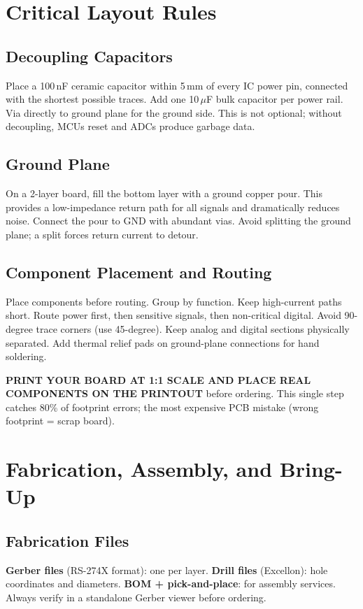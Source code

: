 \documentclass[11pt,letterpaper,twoside,openany]{book}
\begin{document}
\section{Critical Layout Rules}

\subsection{Decoupling Capacitors}
Place a 100\,nF ceramic capacitor within 5\,mm of every IC power pin, connected with the shortest possible traces. Add one 10\,$\mu$F bulk capacitor per power rail. Via directly to ground plane for the ground side. This is not optional; without decoupling, MCUs reset and ADCs produce garbage data.

\subsection{Ground Plane}
On a 2-layer board, fill the bottom layer with a ground copper pour. This provides a low-impedance return path for all signals and dramatically reduces noise. Connect the pour to GND with abundant vias. Avoid splitting the ground plane; a split forces return current to detour.

\subsection{Component Placement and Routing}
Place components before routing. Group by function. Keep high-current paths short. Route power first, then sensitive signals, then non-critical digital. Avoid 90-degree trace corners (use 45-degree). Keep analog and digital sections physically separated. Add thermal relief pads on ground-plane connections for hand soldering.

\begin{tipbox}
\textbf{PRINT YOUR BOARD AT 1:1 SCALE AND PLACE REAL COMPONENTS ON THE PRINTOUT} before ordering. This single step catches 80\% of footprint errors; the most expensive PCB mistake (wrong footprint = scrap board).
\end{tipbox}

\section{Fabrication, Assembly, and Bring-Up}

\subsection{Fabrication Files}
\textbf{Gerber files} (RS-274X format): one per layer. \textbf{Drill files} (Excellon): hole coordinates and diameters. \textbf{BOM + pick-and-place}: for assembly services. Always verify in a standalone Gerber viewer before ordering.
\end{document}
